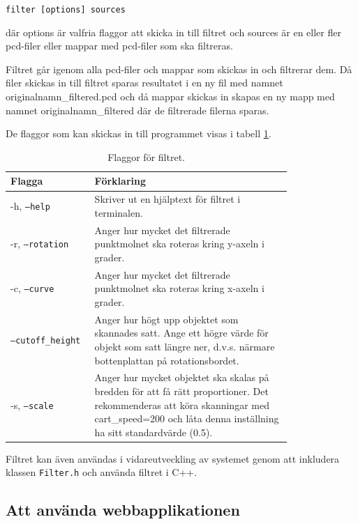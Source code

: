 \documentclass[a4paper,titlepage,12pt]{article}
\begin{document}
	\texttt{filter [options] sources}
	
	där options är valfria flaggor att skicka in till filtret och sources är en eller fler pcd-filer eller mappar med pcd-filer som ska filtreras.
	
	Filtret går igenom alla pcd-filer och mappar som skickas in och filtrerar dem. Då filer skickas in till filtret sparas resultatet i en ny fil med namnet originalnamn\_filtered.pcd och då mappar skickas in skapas en ny mapp med namnet originalnamn\_filtered där de filtrerade filerna sparas.
	
	De flaggor som kan skickas in till programmet visas i tabell \ref{tab:filter_flaggor}.
	
	\begin{table}[H]
		\centering
		\caption{Flaggor för filtret.}
		\label{tab:filter_flaggor}
		
		\begin{tabular}{p{0.2\linewidth}p{0.6\linewidth}}
			Flagga & Förklaring \\
			\hline
			-h, \texttt{--help} & Skriver ut en hjälptext för filtret i terminalen. \\
			\hline
			-r, \texttt{--rotation} & Anger hur mycket det filtrerade punktmolnet ska roteras kring y-axeln i grader. \\
			\hline
			-c, \texttt{--curve} & Anger hur mycket det filtrerade punktmolnet ska roteras kring x-axeln i grader. \\
			\hline
			\texttt{--cutoff\_height} & Anger hur högt upp objektet som skannades satt. Ange ett högre värde för objekt som satt längre ner, d.v.s. närmare bottenplattan på rotationsbordet. \\
			\hline
			-s, \texttt{--scale} & Anger hur mycket objektet ska skalas på bredden för att få rätt proportioner. Det rekommenderas att köra skanningar med cart\_speed=200 och låta denna inställning ha sitt standardvärde (0.5). \\
			\hline
		\end{tabular}
	
	\end{table}

	Filtret kan även användas i vidareutveckling av systemet genom att inkludera klassen \texttt{Filter.h} och använda filtret i C++.
	
	\subsection{Att använda webbapplikationen}
	
\end{document}
